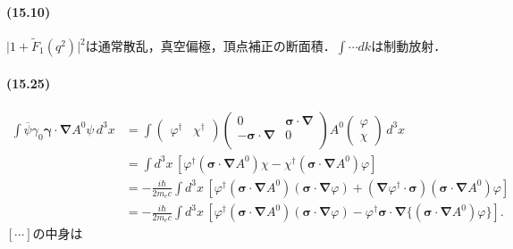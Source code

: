 \paragraph{(15.10)}
$\lvert 1 + \tilde{F}_1(q^2) \rvert^2$は通常散乱，真空偏極，頂点補正の断面積．$\int\cdots dk$は制動放射．



\paragraph{(15.25)}
\begin{align*}
  \int \overline{\psi} \gamma_0 \boldsymbol{\gamma} \cdot \boldsymbol{\nabla} A^0 \psi\, d^3x & = \int
  \begin{pmatrix}
    \varphi^\dagger & \chi^\dagger
  \end{pmatrix}
  \begin{pmatrix}
    0 & \boldsymbol{\sigma} \cdot \boldsymbol{\nabla} \\
    -\boldsymbol{\sigma} \cdot \boldsymbol{\nabla} & 0 \\
  \end{pmatrix}
  A^0
  \begin{pmatrix}
    \varphi \\
    \chi
  \end{pmatrix}
  \,d^3x\\
  & = \int d^3x\, [\varphi^\dagger (\boldsymbol{\sigma} \cdot \boldsymbol{\nabla} A^0) \chi - \chi^\dagger (\boldsymbol{\sigma} \cdot \boldsymbol{\nabla} A^0) \varphi] \\
  & = -\frac{i\hbar}{2m_ec}\int d^3x\, [\varphi^\dagger (\boldsymbol{\sigma} \cdot \boldsymbol{\nabla} A^0) (\boldsymbol{\sigma} \cdot \boldsymbol{\nabla} \varphi) + (\boldsymbol{\nabla} \varphi^\dagger \cdot \boldsymbol{\sigma}) (\boldsymbol{\sigma} \cdot \boldsymbol{\nabla} A^0) \varphi] \\
  & = -\frac{i\hbar}{2m_ec}\int d^3x\, [\varphi^\dagger (\boldsymbol{\sigma} \cdot \boldsymbol{\nabla} A^0) (\boldsymbol{\sigma} \cdot \boldsymbol{\nabla} \varphi) - \varphi^\dagger \boldsymbol{\sigma} \cdot \boldsymbol{\nabla} \{(\boldsymbol{\sigma} \cdot \boldsymbol{\nabla} A^0) \varphi\}].
\end{align*}
$[\cdots]$の中身は
